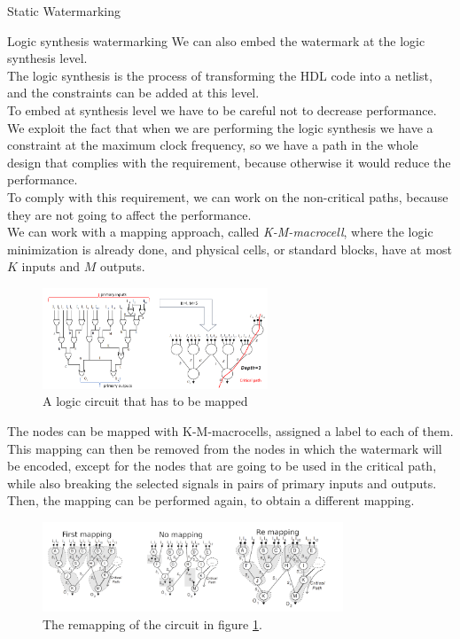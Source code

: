 \begin{section}{Static Watermarking}
  \begin{subsection}{Logic synthesis watermarking}
    We can also embed the watermark at the logic synthesis level.\\
    The logic synthesis is the process of transforming the HDL code into a netlist, and the constraints
    can be added at this level.\\
    To embed at synthesis level we have to be careful not to decrease performance.\\
    We exploit the fact that when we are performing the logic synthesis we have a constraint at the 
    maximum clock frequency, so we have a path in the whole design that complies with the requirement,
    because otherwise it would reduce the performance.\\
    To comply with this requirement, we can work on the non-critical paths, because they are not going
    to affect the performance.\\
    We can work with a mapping approach, called \textit{K-M-macrocell}, where the logic minimization is
    already done, and physical cells, or standard blocks, have at most $K$ inputs and $M$ outputs.\\
    \begin{figure}[H]
      \centering
      \includegraphics[width=0.6\textwidth]{img/hardware/mapping watermarking.png}
      \caption{A logic circuit that has to be mapped}
      \label{fig:K-M-macrocell}
    \end{figure}
    The nodes can be mapped with K-M-macrocells, assigned a label to each of them. This mapping can 
    then be removed from the nodes in which the watermark will be encoded, except for the nodes that 
    are going to be used in the critical path, while also breaking the selected signals in pairs 
    of primary inputs and outputs.\\
    Then, the mapping can be performed again, to obtain a different mapping.
    \begin{figure}[H]
      \centering
      \includegraphics[width=0.8\textwidth]{img/hardware/mapping watermarking 2.png}
      \caption{The remapping of the circuit in figure \ref{fig:K-M-macrocell}.}
      \label{fig:K-M-macrocell2}
    \end{figure}
  \end{subsection}


\end{section}
